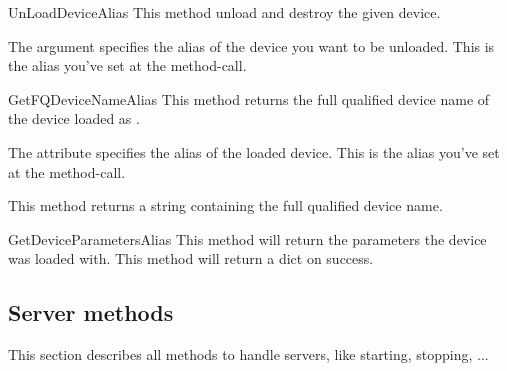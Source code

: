 \begin{methoddesc}[System]{UnLoadDevice}{Alias}
This method unload and destroy the given device. 

The argument  specifies the alias of the device you want to be
unloaded. This is the alias you've set at the  
method-call.
\end{methoddesc}


\begin{methoddesc}[System]{GetFQDeviceName}{Alias}
This method returns the full qualified device name of the device loaded as
.

The attribute  specifies the alias of the loaded device. This is
the alias you've set at the  method-call.

This method returns a string containing the full qualified device name.
\end{methoddesc}


\begin{methoddesc}[System]{GetDeviceParameters}{Alias}
This method will return the parameters the device was loaded with. This method
will return a dict on success.
\end{methoddesc}


\subsection{Server methods}
This section describes all methods to handle servers, like starting, stopping, ... 

